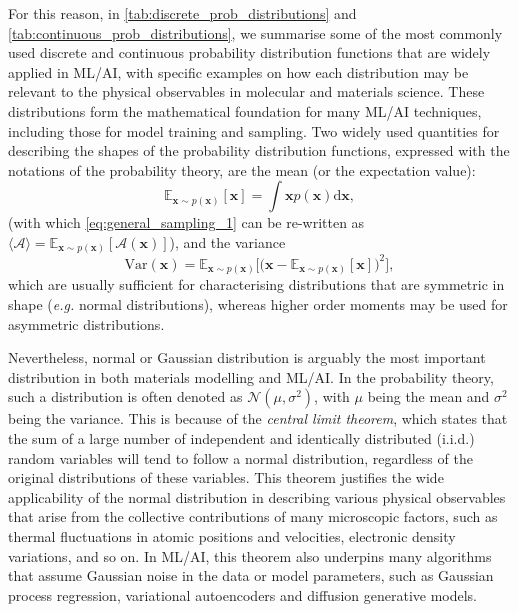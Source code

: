 For this reason, in \cref{tab:discrete_prob_distributions} and \cref{tab:continuous_prob_distributions}, we summarise some of the most commonly used discrete and continuous probability distribution functions that are widely applied in ML/AI,  with specific examples on how each distribution may be relevant to the physical observables in molecular and materials science. These distributions form the mathematical foundation for many ML/AI techniques, including those for model training and sampling. Two widely used quantities for describing the shapes of the probability distribution functions, expressed with the notations of the probability theory, are the mean (or the expectation value):
\begin{equation}
    \label{eq:expectation_value}
    \mathbb{E}_{\bm{x}\sim p(\bm{x})}[\bm{x}]=\int \bm{x}p(\bm{x})\mbox{d}\bm{x},
\end{equation}
(with which \cref{eq:general_sampling_1} can be re-written as $\langle\mathcal{A}\rangle=\mathbb{E}_{\bm{x}\sim p(\bm{x})} [\mathcal{A}(\bm{x})]$), and the variance
\begin{equation}
    \label{eq:variance}
    \mbox{Var}(\bm{x})=\mathbb{E}_{\bm{x}\sim p(\bm{x})}\Big[\big(\bm{x}-\mathbb{E}_{\bm{x}\sim p(\bm{x})}[\bm{x}]\big)^2\Big],
\end{equation}
which are usually sufficient for characterising distributions that are symmetric in shape (\emph{e.g.} normal distributions), whereas higher order moments may be used for asymmetric distributions. 

Nevertheless, normal or Gaussian distribution is arguably the most important distribution in both materials modelling and ML/AI. In the probability theory, such a distribution is often denoted as $\mathcal{N}(\mu,\sigma^2)$, with $\mu$ being the mean and $\sigma^2$ being the variance. This is because of the \emph{central limit theorem}, which states that the sum of a large number of independent and identically distributed (i.i.d.) random variables will tend to follow a normal distribution, regardless of the original distributions of these variables. This theorem justifies the wide applicability of the normal distribution in describing various physical observables that arise from the collective contributions of many microscopic factors, such as thermal fluctuations in atomic positions and velocities, electronic density variations, and so on. In ML/AI, this theorem also underpins many algorithms that assume Gaussian noise in the data or model parameters, such as Gaussian process regression,\cite{bartok2010gaussian} variational autoencoders and diffusion generative models.\cite{ho2020denoising,song2020denoising}

